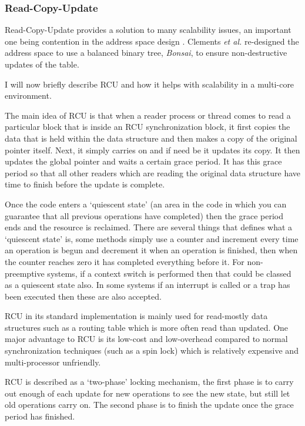 \documentclass[journal]{IEEEtran}
\begin{document}
\subsubsection{Read-Copy-Update}
Read-Copy-Update provides a solution to many scalability issues, an important one being contention in the address space design \cite{Bonsai}. Clements \emph{et al.} re-designed the address space to use a balanced binary tree, \emph{Bonsai}, to ensure non-destructive updates of the table.

I will now briefly describe RCU and how it helps with scalability in a multi-core environment.

The main idea of RCU is that when a reader process or thread comes to read a particular block that is inside an RCU synchronization block, it first copies the data that is held within the data structure and then makes a copy of the original pointer itself. Next, it simply carries on and if need be it updates its copy. It then updates the global pointer and waits a certain grace period. It has this grace period so that all other readers which are reading the original data structure have time to finish before the update is complete. 

Once the code enters a `quiescent state' (an area in the code in which you can guarantee that all previous operations have completed) then the grace period ends and the resource is reclaimed. There are several things that defines what a `quiescent state' is, some methods simply use a counter and increment every time an operation is begun and decrement it when an operation is finished, then when the counter reaches zero it has completed everything before it. For non-preemptive systems, if a context switch is performed then that could be classed as a quiescent state also. In some systems if an interrupt is called or a trap has been executed then these are also accepted.

RCU in its standard implementation is mainly used for read-mostly data structures such as a routing table which is more often read than updated. One major advantage to RCU is its low-cost and low-overhead compared to normal synchronization techniques (such as a spin lock) which is relatively expensive and multi-processor unfriendly.

RCU is described as a `two-phase' locking mechanism, the first phase is to carry out enough of each update for new operations to see the new state, but still let old operations carry on. The second phase is to finish the update once the grace period has finished.
\end{document}
